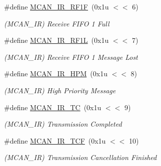 \begin{DoxyCompactItemize}
\#define \mbox{\hyperlink{group__SAMV71__MCAN_gadc72250dd1be6299a69c6df46e1bd293}{M\+C\+A\+N\+\_\+\+I\+R\+\_\+\+R\+F1F}}~(0x1u $<$$<$ 6)
\begin{DoxyCompactList}\small\item\em (M\+C\+A\+N\+\_\+\+IR) Receive F\+I\+FO 1 Full \end{DoxyCompactList}\item 
\mbox{\label{group__SAMV71__MCAN_gafdb85b7b09ed00489b6d1f558c8c9479}} 
\#define \mbox{\hyperlink{group__SAMV71__MCAN_gafdb85b7b09ed00489b6d1f558c8c9479}{M\+C\+A\+N\+\_\+\+I\+R\+\_\+\+R\+F1L}}~(0x1u $<$$<$ 7)
\begin{DoxyCompactList}\small\item\em (M\+C\+A\+N\+\_\+\+IR) Receive F\+I\+FO 1 Message Lost \end{DoxyCompactList}\item 
\mbox{\label{group__SAMV71__MCAN_gad3b6ce7daf220524679d149b5c3233d6}} 
\#define \mbox{\hyperlink{group__SAMV71__MCAN_gad3b6ce7daf220524679d149b5c3233d6}{M\+C\+A\+N\+\_\+\+I\+R\+\_\+\+H\+PM}}~(0x1u $<$$<$ 8)
\begin{DoxyCompactList}\small\item\em (M\+C\+A\+N\+\_\+\+IR) High Priority Message \end{DoxyCompactList}\item 
\mbox{\label{group__SAMV71__MCAN_gadccaacdf029e217e61ce95f5b6a66d2e}} 
\#define \mbox{\hyperlink{group__SAMV71__MCAN_gadccaacdf029e217e61ce95f5b6a66d2e}{M\+C\+A\+N\+\_\+\+I\+R\+\_\+\+TC}}~(0x1u $<$$<$ 9)
\begin{DoxyCompactList}\small\item\em (M\+C\+A\+N\+\_\+\+IR) Transmission Completed \end{DoxyCompactList}\item 
\mbox{\label{group__SAMV71__MCAN_ga4d1fa6e564a9b9cc67f9f7e080c702c3}} 
\#define \mbox{\hyperlink{group__SAMV71__MCAN_ga4d1fa6e564a9b9cc67f9f7e080c702c3}{M\+C\+A\+N\+\_\+\+I\+R\+\_\+\+T\+CF}}~(0x1u $<$$<$ 10)
\begin{DoxyCompactList}\small\item\em (M\+C\+A\+N\+\_\+\+IR) Transmission Cancellation Finished \end{DoxyCompactList}\item 
$$
\end{DoxyCompactItemize}
